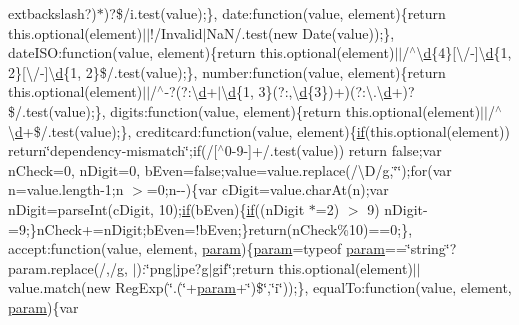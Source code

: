 \begin{DoxyCompactItemize}
extbackslash{}?)$\ast$)?\$/i.\+test(value);\}, date\+:function(value, element)\{return this.\+optional(element)$\vert$$\vert$!/Invalid$\vert$Na\+N/.test(new Date(value));\}, date\+I\+S\+O\+:function(value, element)\{return this.\+optional(element)$\vert$$\vert$/$^\wedge$\textbackslash{}\hyperlink{_scripts_2respond_8min_8js_aeb337d295abaddb5ec3cb34cc2e2bbc9}{d}\{4\}\mbox{[}\textbackslash{}/-\/\mbox{]}\textbackslash{}\hyperlink{_scripts_2respond_8min_8js_aeb337d295abaddb5ec3cb34cc2e2bbc9}{d}\{1, 2\}\mbox{[}\textbackslash{}/-\/\mbox{]}\textbackslash{}\hyperlink{_scripts_2respond_8min_8js_aeb337d295abaddb5ec3cb34cc2e2bbc9}{d}\{1, 2\}\$/.test(value);\}, number\+:function(value, element)\{return this.\+optional(element)$\vert$$\vert$/$^\wedge$-\/?(?\+:\textbackslash{}\hyperlink{_scripts_2respond_8min_8js_aeb337d295abaddb5ec3cb34cc2e2bbc9}{d}+$\vert$\textbackslash{}\hyperlink{_scripts_2respond_8min_8js_aeb337d295abaddb5ec3cb34cc2e2bbc9}{d}\{1, 3\}(?\+:,\textbackslash{}\hyperlink{_scripts_2respond_8min_8js_aeb337d295abaddb5ec3cb34cc2e2bbc9}{d}\{3\})+)(?\+:\textbackslash{}.\textbackslash{}\hyperlink{_scripts_2respond_8min_8js_aeb337d295abaddb5ec3cb34cc2e2bbc9}{d}+)?\$/.test(value);\}, digits\+:function(value, element)\{return this.\+optional(element)$\vert$$\vert$/$^\wedge$\textbackslash{}\hyperlink{_scripts_2respond_8min_8js_aeb337d295abaddb5ec3cb34cc2e2bbc9}{d}+\$/.test(value);\}, creditcard\+:function(value, element)\{\hyperlink{_scripts_2respond_8min_8js_a93851d60dd037a83509a1757b9ee7b66}{if}(this.\+optional(element)) return\char`\"{}dependency-\/mismatch\char`\"{};if(/\mbox{[}$^\wedge$0-\/9-\/\mbox{]}+/.test(value)) return false;var n\+Check=0, n\+Digit=0, b\+Even=false;value=value.\+replace(/\textbackslash{}D/\hyperlink{jquery_8unobtrusive-ajax_8min_8js_abdf64181dd0fecc8ac45c3cfa81562b1}{g},\char`\"{}\char`\"{});for(var n=value.\+length-\/1;n $>$=0;n-\/-\/)\{var c\+Digit=value.\+char\+At(n);var n\+Digit=parse\+Int(c\+Digit, 10);\hyperlink{_scripts_2respond_8min_8js_a93851d60dd037a83509a1757b9ee7b66}{if}(b\+Even)\{\hyperlink{_scripts_2respond_8min_8js_a93851d60dd037a83509a1757b9ee7b66}{if}((n\+Digit $\ast$=2) $>$ 9) n\+Digit-\/=9;\}n\+Check+=n\+Digit;b\+Even=!b\+Even;\}return(n\+Check\%10)==0;\}, accept\+:function(value, element, \hyperlink{_scripts_2jquery-1_810_82_8min_8js_ae8915303d11557d1b001bc56b6195251}{param})\{\hyperlink{_scripts_2jquery-1_810_82_8min_8js_ae8915303d11557d1b001bc56b6195251}{param}=typeof \hyperlink{_scripts_2jquery-1_810_82_8min_8js_ae8915303d11557d1b001bc56b6195251}{param}==\char`\"{}string\char`\"{}?param.\+replace(/,/\hyperlink{jquery_8unobtrusive-ajax_8min_8js_abdf64181dd0fecc8ac45c3cfa81562b1}{g}, \textquotesingle{}$\vert$\textquotesingle{})\+:\char`\"{}png$\vert$jpe?\hyperlink{jquery_8unobtrusive-ajax_8min_8js_abdf64181dd0fecc8ac45c3cfa81562b1}{g}$\vert$gif\char`\"{};return this.\+optional(element)$\vert$$\vert$value.\+match(new Reg\+Exp(\char`\"{}.(\char`\"{}+\hyperlink{_scripts_2jquery-1_810_82_8min_8js_ae8915303d11557d1b001bc56b6195251}{param}+\char`\"{})\$\char`\"{},\char`\"{}i\char`\"{}));\}, equal\+To\+:function(value, element, \hyperlink{_scripts_2jquery-1_810_82_8min_8js_ae8915303d11557d1b001bc56b6195251}{param})\{var 
\end{DoxyCompactItemize}
